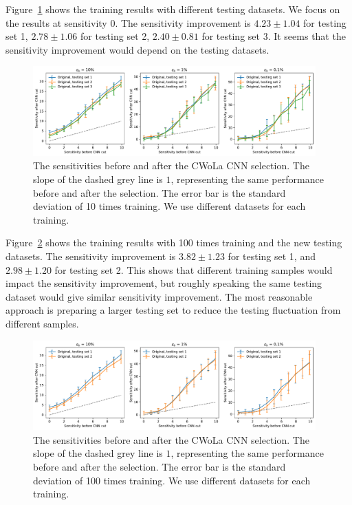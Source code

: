 \documentclass[12pt]{article}
\begin{document}
        Figure~\ref{fig:sensitivity_improvement_new_testing_data} shows the training results with different testing datasets. We focus on the results at sensitivity 0. The sensitivity improvement is $4.23 \pm 1.04$ for testing set 1, $2.78 \pm 1.06$ for testing set 2, $2.40 \pm 0.81$ for testing set 3. It seems that the sensitivity improvement would depend on the testing datasets.
        \begin{figure}[htpb]
            \centering
            \includegraphics[width=0.97\textwidth]{HVmodel_sensitivity_improvement_origin_bkg_subtraction_new_testing_set.pdf}
            \caption{The sensitivities before and after the CWoLa CNN selection. The slope of the dashed grey line is $1$, representing the same performance before and after the selection. The error bar is the standard deviation of 10 times training. We use different datasets for each training.}
            \label{fig:sensitivity_improvement_new_testing_data}
        \end{figure}

        Figure~\ref{fig:sensitivity_improvement_100_random_seed_new_testing_set} shows the training results with 100 times training and the new testing datasets. The sensitivity improvement is $3.82 \pm 1.23$ for testing set 1, and $2.98 \pm 1.20$ for testing set 2. This shows that different training samples would impact the sensitivity improvement, but roughly speaking the same testing dataset would give similar sensitivity improvement. The most reasonable approach is preparing a larger testing set to reduce the testing fluctuation from different samples.
        \begin{figure}[htpb]
            \centering
            \includegraphics[width=0.97\textwidth]{HVmodel_sensitivity_improvement_origin_bkg_subtraction_100_random_seed_new_testing_set.pdf}
            \caption{The sensitivities before and after the CWoLa CNN selection. The slope of the dashed grey line is $1$, representing the same performance before and after the selection. The error bar is the standard deviation of 100 times training. We use different datasets for each training.}
            \label{fig:sensitivity_improvement_100_random_seed_new_testing_set}
        \end{figure}
\end{document}
